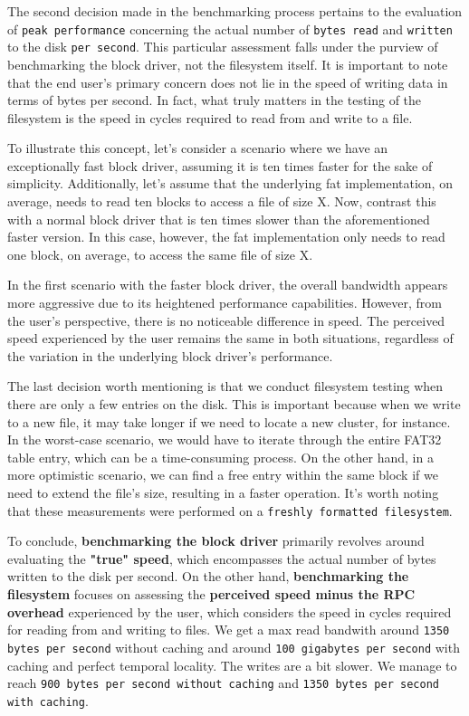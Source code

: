 {The second decision made in the benchmarking process pertains to the evaluation of \texttt{peak performance} concerning the actual number of \texttt{bytes read} and \texttt{written} to the disk \texttt{per second}. This particular assessment falls under the purview of benchmarking the block driver, not the filesystem itself. It is important to note that the end user's primary concern does not lie in the speed of writing data in terms of bytes per second. In fact, what truly matters in the testing of the filesystem is the speed in cycles required to read from and write to a file.

To illustrate this concept, let's consider a scenario where we have an exceptionally fast block driver, assuming it is ten times faster for the sake of simplicity. Additionally, let's assume that the underlying fat implementation, on average, needs to read ten blocks to access a file of size X. Now, contrast this with a normal block driver that is ten times slower than the aforementioned faster version. In this case, however, the fat implementation only needs to read one block, on average, to access the same file of size X.

In the first scenario with the faster block driver, the overall bandwidth appears more aggressive due to its heightened performance capabilities. However, from the user's perspective, there is no noticeable difference in speed. The perceived speed experienced by the user remains the same in both situations, regardless of the variation in the underlying block driver's performance.

The last decision worth mentioning is that we conduct filesystem testing when there are only a few entries on the disk. This is important because when we write to a new file, it may take longer if we need to locate a new cluster, for instance. In the worst-case scenario, we would have to iterate through the entire FAT32 table entry, which can be a time-consuming process. On the other hand, in a more optimistic scenario, we can find a free entry within the same block if we need to extend the file's size, resulting in a faster operation. It's worth noting that these measurements were performed on a \texttt{freshly formatted filesystem}.

To conclude, \textbf{benchmarking the block driver} primarily revolves around evaluating the \textbf{"true" speed}, which encompasses the actual number of bytes written to the disk per second. On the other hand, \textbf{benchmarking the filesystem} focuses on assessing the \textbf{perceived speed minus the RPC overhead} experienced by the user, which considers the speed in cycles required for reading from and writing to files. We get a max read bandwith around \texttt{1350 bytes per second} without caching and around \texttt{100 gigabytes per second} with caching and perfect temporal locality. The writes are a bit slower. We manage to reach \texttt{900 bytes per second without caching} and \texttt{1350 bytes per second with caching}.



}
